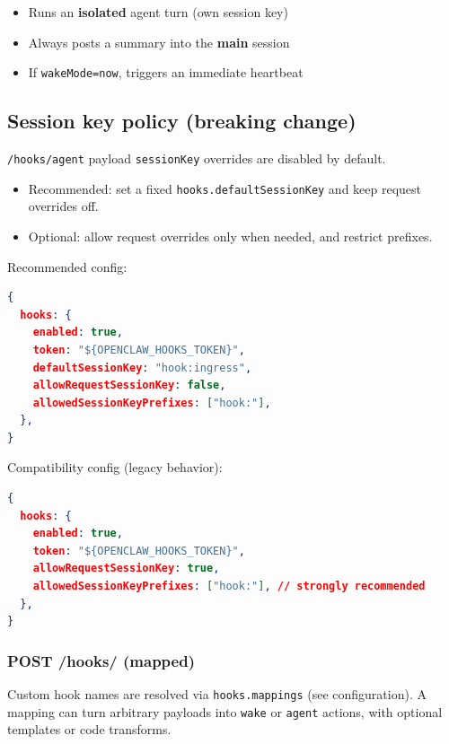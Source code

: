 \begin{itemize}
  \item Runs an \textbf{isolated} agent turn (own session key)
  \item Always posts a summary into the \textbf{main} session
  \item If \texttt{wakeMode=now}, triggers an immediate heartbeat
\end{itemize}


\subsection{Session key policy (breaking change)}


\texttt{/hooks/agent} payload \texttt{sessionKey} overrides are disabled by default.

\begin{itemize}
  \item Recommended: set a fixed \texttt{hooks.defaultSessionKey} and keep request overrides off.
  \item Optional: allow request overrides only when needed, and restrict prefixes.
\end{itemize}


Recommended config:

\begin{lstlisting}[language=json]
{
  hooks: {
    enabled: true,
    token: "${OPENCLAW_HOOKS_TOKEN}",
    defaultSessionKey: "hook:ingress",
    allowRequestSessionKey: false,
    allowedSessionKeyPrefixes: ["hook:"],
  },
}
\end{lstlisting}


Compatibility config (legacy behavior):

\begin{lstlisting}[language=json]
{
  hooks: {
    enabled: true,
    token: "${OPENCLAW_HOOKS_TOKEN}",
    allowRequestSessionKey: true,
    allowedSessionKeyPrefixes: ["hook:"], // strongly recommended
  },
}
\end{lstlisting}


\subsubsection{POST /hooks/ (mapped)}


Custom hook names are resolved via \texttt{hooks.mappings} (see configuration). A mapping can
turn arbitrary payloads into \texttt{wake} or \texttt{agent} actions, with optional templates or
code transforms.

